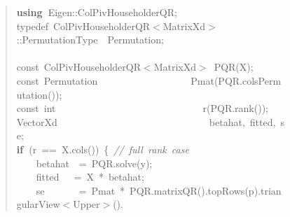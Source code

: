 \documentclass[shortnames,article]{jss}
\newcommand{\hlstd}[1]{\textcolor[rgb]{0,0,0}{#1}}
\newcommand{\hlopt}[1]{\textcolor[rgb]{0,0,0}{#1}}
\newcommand{\hlslc}[1]{\textcolor[rgb]{0.67,0.13,0.13}{\it{#1}}}
\newcommand{\hlkwa}[1]{\textcolor[rgb]{0.61,0.13,0.93}{\bf{#1}}}
\newcommand{\hlkwb}[1]{\textcolor[rgb]{0.13,0.54,0.13}{#1}}
\newcommand{\hlkwc}[1]{\textcolor[rgb]{0,0,1}{#1}}
\newcommand{\hlkwd}[1]{\textcolor[rgb]{0,0,0}{#1}}
\begin{document}
\begin{figure}[htb]
  \begin{quote}
    \noindent
    \ttfamily
    \hlstd{}\hlkwa{using\ }\hlstd{Eigen}\hlopt{::}\hlstd{ColPivHouseholderQR}\hlopt{;}\hspace*{\fill}\\
    \hlstd{}\hlkwc{typedef\ }\hlstd{ColPivHouseholderQR}\hlopt{$<$}\hlstd{MatrixXd}\hlopt{$>$::}\hlstd{PermutationType}\hlstd{\ \ }\hlstd{Permutation}\hlopt{;}\hspace*{\fill}\\
    \hlstd{}\hspace*{\fill}\\
    \hlkwb{const\ }\hlstd{ColPivHouseholderQR}\hlopt{$<$}\hlstd{MatrixXd}\hlopt{$>$\ }\hlstd{}\hlkwd{PQR}\hlstd{}\hlopt{(}\hlstd{X}\hlopt{);}\hspace*{\fill}\\
    \hlstd{}\hlkwb{const\ }\hlstd{Permutation}\hlstd{\ \ \ \ \ \ \ \ \ \ \ \ \ \ \ \ \ \ \ }\hlstd{}\hlkwd{Pmat}\hlstd{}\hlopt{(}\hlstd{PQR}\hlopt{.}\hlstd{}\hlkwd{colsPermutation}\hlstd{}\hlopt{());}\hspace*{\fill}\\
    \hlstd{}\hlkwb{const\ int}\hlstd{\ \ \ \ \ \ \ \ \ \ \ \ \ \ \ \ \ \ \ \ \ \ \ \ \ \ \ \ \ \ }\hlkwb{}\hlstd{}\hlkwd{r}\hlstd{}\hlopt{(}\hlstd{PQR}\hlopt{.}\hlstd{}\hlkwd{rank}\hlstd{}\hlopt{());}\hspace*{\fill}\\
    \hlstd{VectorXd}\hlstd{\ \ \ \ \ \ \ \ \ \ \ \ \ \ \ \ \ \ \ \ \ \ \ \ \ \ \ \ \ \ \ }\hlstd{betahat}\hlopt{,\ }\hlstd{fitted}\hlopt{,\ }\hlstd{se}\hlopt{;}\hspace*{\fill}\\
    \hlstd{}\hlkwa{if\ }\hlstd{}\hlopt{(}\hlstd{r\ }\hlopt{==\ }\hlstd{X}\hlopt{.}\hlstd{}\hlkwd{cols}\hlstd{}\hlopt{())\ \{\ }\hlstd{}\hlslc{//\ full\ rank\ case}\hspace*{\fill}\\
    \hlstd{}\hlstd{\ \ \ \ }\hlstd{betahat}\hlstd{\ \ }\hlstd{}\hlopt{=\ }\hlstd{PQR}\hlopt{.}\hlstd{}\hlkwd{solve}\hlstd{}\hlopt{(}\hlstd{y}\hlopt{);}\hspace*{\fill}\\
    \hlstd{}\hlstd{\ \ \ \ }\hlstd{fitted}\hlstd{\ \ \ }\hlstd{}\hlopt{=\ }\hlstd{X\ }\hlopt{{*}\ }\hlstd{betahat}\hlopt{;}\hspace*{\fill}\\
    \hlstd{}\hlstd{\ \ \ \ }\hlstd{se}\hlstd{\ \ \ \ \ \ \ }\hlstd{}\hlopt{=\ }\hlstd{Pmat\ }\hlopt{{*}\ }\hlstd{PQR}\hlopt{.}\hlstd{}\hlkwd{matrixQR}\hlstd{}\hlopt{().}\hlstd{}\hlkwd{topRows}\hlstd{}\hlopt{(}\hlstd{p}\hlopt{).}\hlstd{triangularView}\hlopt{$<$}\hlstd{Upper}\hlopt{$>$().}\hspace*{\fill}\\

\end{quote}
\end{figure}
\end{document}
